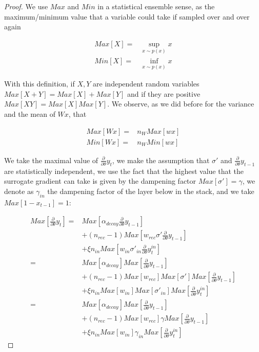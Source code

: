 \begin{proof}
We use  $Max$ and $Min$ in a statistical ensemble sense, as the maximum/minimum value that a variable could take if sampled over and over again

\begin{align}
    Max[X] =& \sup_{x\sim p(x)} x \\
    Min[X] =& \inf_{x\sim p(x)} x 
\end{align}


With this definition, if $X,Y$ are independent random variables  $Max[X+Y]=Max[X] + Max[Y]$ and if they are positive $Max[XY]=Max[X]Max[Y]$.
We observe, as we did before for the variance and the mean of $Wx$, that


\begin{align}
    Max[Wx] =& n_WMax[wx] \\
    Min[Wx] =& n_WMin[wx]
\end{align}

We take the maximal value of $\frac{\partial}{\partial \theta}y_t$, we make the  assumption that $\sigma'$ and $\frac{\partial}{\partial \theta}y_{t-1}$ are statistically independent,  we use the fact that the highest value that the surrogate gradient can take is given by the dampening factor $Max[\sigma']=\gamma$, we denote as $\gamma_{in}$ the dampening factor of the layer below in the stack, and we take $Max[1-x_{t-1}]=1$:

\begin{align}
    Max[\frac{\partial}{\partial \theta}y_t] =& Max[\alpha_{decay} \frac{\partial}{\partial \theta}y_{t-1}] 
    \nonumber\\&+ (n_{rec}-1)Max[w_{rec}\sigma'\frac{\partial}{\partial \theta}y_{t-1}] \nonumber\\ &+ \xi n_{in}Max[ w_{in}\sigma'_{in}\frac{\partial}{\partial \theta}y_{t}^{in}] \\
    =& Max[\alpha_{decay} ] Max[\frac{\partial}{\partial \theta}y_{t-1}] 
    \nonumber\\&+ (n_{rec}-1)Max[w_{rec}] Max[\sigma'] Max[\frac{\partial}{\partial \theta}y_{t-1}] \nonumber \\
    &+ \xi n_{in} Max[w_{in}] Max[\sigma'_{in}]Max[\frac{\partial}{\partial \theta}y_{t}^{in}]  \\
    =& Max[\alpha_{decay} ] Max[\frac{\partial}{\partial \theta}y_{t-1}]
    \nonumber\\&+ (n_{rec}-1)Max[w_{rec}] \gamma Max[\frac{\partial}{\partial \theta}y_{t-1}] \nonumber \\
    &+\xi n_{in} Max[w_{in}] \gamma_{in}Max[\frac{\partial}{\partial \theta}y_{t}^{in}] 
\end{align}



\end{proof}
